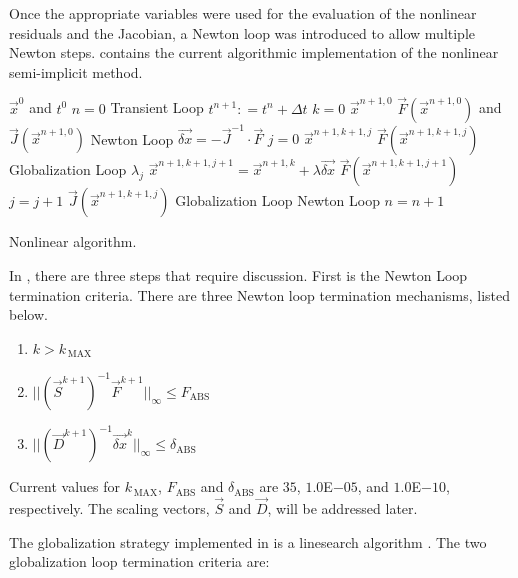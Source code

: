 Once the appropriate variables were used for the evaluation of the nonlinear residuals and the Jacobian, a Newton loop was introduced to allow multiple Newton steps.
 contains the current algorithmic implementation of the nonlinear semi-implicit method.

\begin{algo}[H]
\setlength{\baselineskip}{0.625\baselineskip}
\begin{algorithmic}[1]
\Require $\vec{x}^{0}$ and $t^{0}$
\Set $n = 0$
\Loop \; Transient Loop
    \State $t^{n+1} : = t^{n} + \Delta t$
    \State $k = 0$
    \Define $\vec{x}^{n+1,0}$
	\Calculate $\vec{F}(\vec{x}^{n+1,0})$ and $\vec{J}(\vec{x}^{n+1,0})$
    \Loop \; Newton Loop
		\Calculate $\vec{\delta x} = - \vec{J}^{-1}\cdot\vec{F}$
		$j = 0$		
		\Calculate $\vec{x}^{n+1,k+1,j}$
		\Calculate $\vec{F}(\vec{x}^{n+1,k+1,j})$
		\Loop \; Globalization Loop
				\Calculate $\lambda_j$
				\Calculate $\vec{x}^{n+1,k+1,j+1} = \vec{x}^{n+1,k} + \lambda \vec{\delta x}$
				\Calculate $\vec{F}(\vec{x}^{n+1,k+1,j+1})$
				\State $j = j + 1$			
			\Else
				\Calculate $\vec{J}(\vec{x}^{n+1,k+1,j})$
				\Exit Globalization Loop
			\EndIf
		\EndLoop			
			\Exit Newton Loop
		\EndIf
	\EndLoop
	\State $n = n + 1$
\EndLoop
\end{algorithmic}
\caption{Nonlinear \cobra{} algorithm.}
\label{alg:nl_cobra}
\end{algo}

In , there are three steps that require discussion.
First is the Newton Loop termination criteria.
There are three Newton loop termination mechanisms, listed below.

\begin{enumerate}
\item{$k > k_{\,\text{MAX}}$}
\item{$||(\vec{S}^{k+1})^{-1}\vec{F}^{k+1}||_{\infty} \leq F_{\text{ABS}}$}
\item{$||(\vec{D}^{k+1})^{-1}\vec{\delta x}^{k}||_{\infty} \leq \delta_{\text{ABS}}$}
\end{enumerate}

Current values for $k_{\,\text{MAX}}$, $F_{\text{ABS}}$ and $\delta_{\text{ABS}}$ are $35$, $1.0$E$-05$, and $1.0$E$-10$, respectively.
The scaling vectors, $\vec{S}$ and $\vec{D}$, will be addressed later.

The globalization strategy implemented in \cobra{} is a linesearch algorithm \cite{Dennis1996}.
The two globalization loop termination criteria are:

